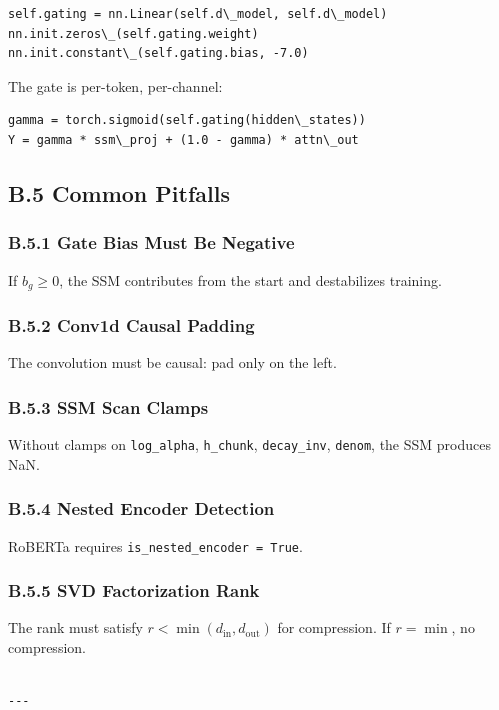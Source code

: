 \begin{lstlisting}
self.gating = nn.Linear(self.d\_model, self.d\_model)
nn.init.zeros\_(self.gating.weight)
nn.init.constant\_(self.gating.bias, -7.0)
\end{lstlisting}

The gate is per-token, per-channel:
\begin{lstlisting}
gamma = torch.sigmoid(self.gating(hidden\_states))
Y = gamma * ssm\_proj + (1.0 - gamma) * attn\_out
\end{lstlisting}

\subsection{B.5 Common Pitfalls}

\subsubsection{B.5.1 Gate Bias Must Be Negative}

If $b_g \geq 0$, the SSM contributes from the start and destabilizes training.

\subsubsection{B.5.2 Conv1d Causal Padding}

The convolution must be causal: pad only on the left.

\subsubsection{B.5.3 SSM Scan Clamps}

Without clamps on \texttt{log\_alpha}, \texttt{h\_chunk}, \texttt{decay\_inv}, \texttt{denom}, the SSM 
produces NaN.

\subsubsection{B.5.4 Nested Encoder Detection}

RoBERTa requires \texttt{is\_nested\_encoder = True}.

\subsubsection{B.5.5 SVD Factorization Rank}

The rank must satisfy $r < \min(d_\text{in}, d_\text{out})$ for 
compression. If $r = \min$, no compression.
\begin{lstlisting}

---
\end{lstlisting}